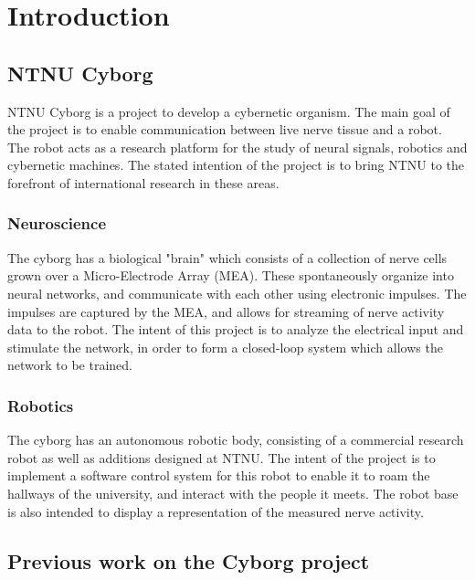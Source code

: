 \documentclass[\rootfolder/main.tex]{subfiles}
\begin{document}
\chapter{Introduction} %

\label{ch:introduction} %

\section{NTNU Cyborg}

NTNU Cyborg is a project to develop a cybernetic organism.
The main goal of the project is to enable communication between live nerve tissue and a robot.
The robot acts as a research platform for the study of neural signals, robotics and cybernetic machines.
The stated intention of the project is to bring NTNU to the forefront of international research in these areas.

\subsection{Neuroscience}

The cyborg has a biological "brain" which consists of a collection of nerve cells grown over a Micro-Electrode Array (MEA).
These spontaneously organize into neural networks, and communicate with each other using electronic impulses.
The impulses are captured by the MEA, and allows for streaming of nerve activity data to the robot.
The intent of this project is to analyze the electrical input and stimulate the network, in order to form a closed-loop system which allows the network to be trained.

\subsection{Robotics}

The cyborg has an autonomous robotic body, consisting of a commercial research robot as well as additions designed at NTNU.
The intent of the project is to implement a software control system for this robot to enable it to roam the hallways of the university, and interact with the people it meets.
The robot base is also intended to display a representation of the measured nerve activity.

\section{Previous work on the Cyborg project}
\end{document}
